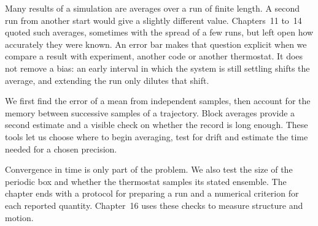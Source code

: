 Many results of a simulation are averages over a run of finite length.
A second run from another start would give a slightly different value.
Chapters~11 to~14 quoted such averages, sometimes with the spread of a
few runs, but left open how accurately they were known. An error bar
makes that question explicit when we compare a result with experiment,
another code or another thermostat. It does not remove a bias: an early
interval in which the system is still settling shifts the average, and
extending the run only dilutes that shift.

We first find the error of a mean from independent samples, then account
for the memory between successive samples of a trajectory. Block averages
provide a second estimate and a visible check on whether the record is
long enough. These tools let us choose where to begin averaging, test for
drift and estimate the time needed for a chosen precision.

Convergence in time is only part of the problem. We also test the size of
the periodic box and whether the thermostat samples its stated ensemble.
The chapter ends with a protocol for preparing a run and a numerical
criterion for each reported quantity. Chapter~16 uses these checks to
measure structure and motion.
